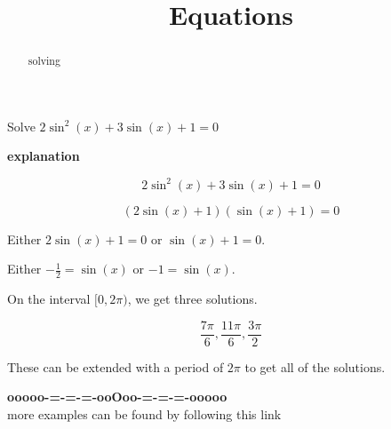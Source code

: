 \documentclass{ximera}
\title{Equations}
\begin{document}
\begin{abstract}
solving
\end{abstract}
\maketitle





\begin{example}

Solve $2 \sin^2(x) + 3 \sin(x) + 1 = 0$

\textbf{\textcolor{red!75!green}{explanation}} 



\[  2 \sin^2(x) + 3 \sin(x) + 1 = 0 \]

\[  (2 \sin(x) + 1) (\sin(x) + 1) = 0 \]


Either $2 \sin(x) + 1 = 0$ or $\sin(x) + 1 = 0$.


Either $-\frac{1}{2} = \sin(x) $ or $-1 = \sin(x)$.


On the interval $[0, 2\pi)$, we get three solutions.


\[ \frac{7\pi}{6}, \frac{11\pi}{6}, \frac{3\pi}{2}  \]


These can be extended with a period of $2\pi$ to get all of the solutions.






\end{example}





















\begin{onlineOnly}
\begin{center}
\textbf{\textcolor{green!50!black}{ooooo-=-=-=-ooOoo-=-=-=-ooooo}} \\

more examples can be found by following this link\\ 

\end{center}
\end{onlineOnly}
\end{document}
